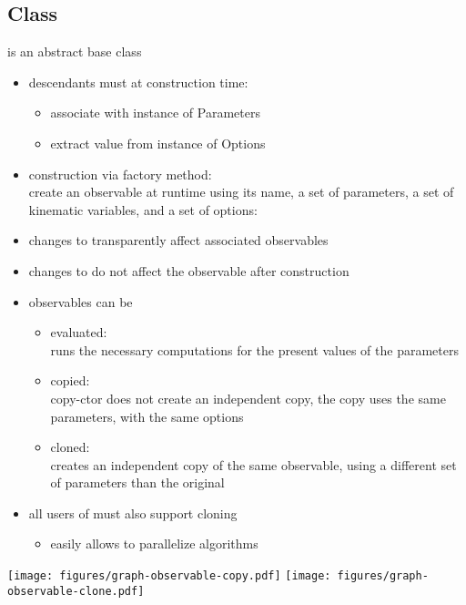 \subsection{Class }

 is an abstract base class\\

\begin{itemize}
    \item descendants must at construction time:
        \begin{itemize}
            \item associate with instance of Parameters
            \item extract value from instance of Options
        \end{itemize}

    \item construction via factory method:\\
       create an observable at runtime using its name, a set of parameters, a set of
       kinematic variables, and a set of options:\\[\medskipamount]


    \item changes to  transparently affect associated observables

    \item changes to  do not affect the observable after construction

    \item observables can be
        \begin{itemize}
            \item evaluated:\\[\smallskipamount]
            runs the necessary computations for the present values of the parameters\\[\smallskipamount]
            \item copied:\\[\smallskipamount]
            copy-ctor does not create an independent copy, the copy uses the same
            parameters, with the same options\\[\smallskipamount]

            \item cloned:\\[\smallskipamount]
            creates an independent copy of the same observable, using a different set of
            parameters than the original
        \end{itemize}

    \item all users of  must also support cloning\\
        \begin{itemize}
            \item easily allows to parallelize algorithms
        \end{itemize}
\end{itemize}

\texttt{[image: figures/graph-observable-copy.pdf]}
\texttt{[image: figures/graph-observable-clone.pdf]}
